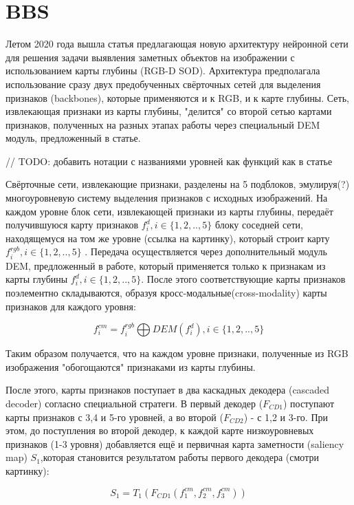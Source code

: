 \section{BBS}


Летом 2020 года вышла статья \cite{BBS} предлагающая новую архитектуру нейронной сети для решения задачи выявления заметных объектов на изображении 
с использованием карты глубины (RGB-D SOD). Архитектура предполагала использование сразу двух предобученных свёрточных сетей
для выделения признаков (backbones), которые применяются и к RGB, и к карте глубины. Сеть, извлекающая признаки
из карты глубины, "делится" со второй сетью картами признаков, полученных на разных этапах работы через специальный DEM модуль, 
предложенный в статье. 


// TODO: добавить нотации с названиями уровней как функций как в статье

Свёрточные сети, извлекающие признаки, разделены на 5 подблоков, эмулируя(?) многоуровневую систему выделения признаков с исходных изображений.
На каждом уровне блок сети, извлекающей признаки из карты глубины, передаёт получившуюся карту признаков $f_i^d, i \in \{1,2,..,5\}$ блоку соседней сети, 
находящемуся на том же уровне (ссылка на картинку), который строит карту $f_i^{rgb}, i \in \{1,2,..,5\}$ . Передача осуществляется через дополнительный модуль DEM, предложенный в работе,
который применяется только к признакам из карты глубины $f_i^d, i \in \{1,2,..,5\}$. 
После этого соответствующие карты признаков поэлементно складываются, образуя кросс-модальные(cross-modality) карты признаков для каждого уровня:

\begin{equation}
    f_i^{cm} = f_i^{rgb} \bigoplus DEM(f_i^{d}), i \in \{1,2,..,5\}
\end{equation}

Таким образом получается, что на каждом уровне признаки, полученные из RGB изображения "обогощаются" признаками из карты глубины.


После этого, карты признаков поступает в два каскадных декодера (cascaded decoder) согласно специальной стратеги. В первый декодер ($F_{CD1}$)
поступают карты признаков с 3,4 и 5-го уровней, а во второй  ($F_{CD2}$) - с 1,2 и 3-го. При этом, до поступления во второй декодер, к каждой карте низкоуровневых 
признаков (1-3 уровня) добавляется ещё и первичная карта заметности (saliency map) $S_1$,которая становится результатом работы первого декодера (смотри картинку):

\begin{equation}
    S_1 = T_1(F_{CD1}(f_1^{cm},f_2^{cm},f_3^{cm}))
\end{equation}

